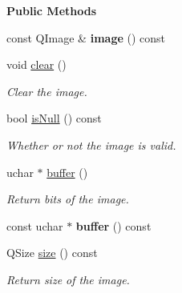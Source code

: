 \begin{Indent}\textbf{ Public Methods}\par
\begin{DoxyCompactItemize}
\item 
\mbox{\label{classrev_1_1_image_aa6e7a87af848858b08f8ac34af6fc008}} 
const Q\+Image \& {\bfseries image} () const
\item 
\mbox{\label{classrev_1_1_image_acc1a30925c1cb02caa7c104cc0f033d8}} 
void \mbox{\hyperlink{classrev_1_1_image_acc1a30925c1cb02caa7c104cc0f033d8}{clear}} ()
\begin{DoxyCompactList}\small\item\em Clear the image. \end{DoxyCompactList}\item 
\mbox{\label{classrev_1_1_image_a8844295b2d39f8a5661eef27b4294c3c}} 
bool \mbox{\hyperlink{classrev_1_1_image_a8844295b2d39f8a5661eef27b4294c3c}{is\+Null}} () const
\begin{DoxyCompactList}\small\item\em Whether or not the image is valid. \end{DoxyCompactList}\item 
\mbox{\label{classrev_1_1_image_ab1890367c76d68d14dd812d27ab8a9e0}} 
uchar $\ast$ \mbox{\hyperlink{classrev_1_1_image_ab1890367c76d68d14dd812d27ab8a9e0}{buffer}} ()
\begin{DoxyCompactList}\small\item\em Return bits of the image. \end{DoxyCompactList}\item 
\mbox{\label{classrev_1_1_image_ae188294710d432c0f0d1df9392b4af3b}} 
const uchar $\ast$ {\bfseries buffer} () const
\item 
\mbox{\label{classrev_1_1_image_ad8f9e8078550c29cb0562c93b2525af0}} 
Q\+Size \mbox{\hyperlink{classrev_1_1_image_ad8f9e8078550c29cb0562c93b2525af0}{size}} () const
\begin{DoxyCompactList}\small\item\em Return size of the image. \end{DoxyCompactList}\item 

\end{DoxyCompactItemize}
\end{Indent}
